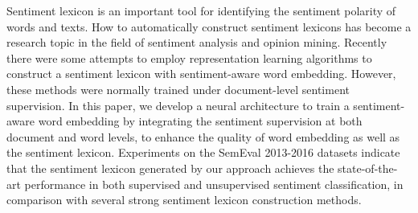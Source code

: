 Sentiment lexicon is an important tool for identifying the sentiment polarity of words and texts. How to automatically construct sentiment lexicons has become a research topic in the field of sentiment analysis and opinion mining. Recently there were some attempts to employ representation learning algorithms to construct a sentiment lexicon with sentiment-aware word embedding. However, these methods were normally trained under document-level sentiment supervision. In this paper, we develop a neural architecture to train a sentiment-aware word embedding by integrating the sentiment supervision at both  document and word levels, to enhance the quality of word embedding as well as the sentiment lexicon. Experiments on the SemEval 2013-2016 datasets indicate that the sentiment lexicon generated by our approach achieves the state-of-the-art performance in both supervised and unsupervised sentiment classification, in comparison with several strong sentiment lexicon construction methods.
